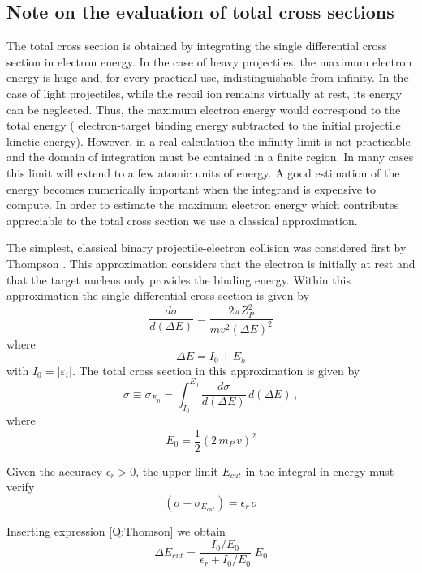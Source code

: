\subsection{Note on the evaluation of total cross sections}

The total cross section is obtained by integrating the single
differential cross section in electron energy. In the case of heavy
projectiles, the maximum electron energy is huge and, for every
practical use, indistinguishable from infinity. In the case of light
projectiles, while the recoil ion remains virtually at rest, its energy
can be neglected. Thus, the maximum electron energy would correspond to
the total energy ( electron-target binding energy subtracted to the
initial projectile kinetic energy). However, in a real calculation the
infinity limit is not practicable and the domain of integration must be
contained in a finite region. In many cases this limit will extend to a
few atomic units of energy. A good estimation of the energy becomes
numerically important when the integrand is expensive to compute. In
order to estimate the maximum electron energy which contributes
appreciable to the total cross section we use a classical
approximation.

The simplest, classical binary projectile-electron collision was
considered first by Thompson \parencite{Thomson1912PMp449}. This approximation
considers that the electron is initially at rest and that the target
nucleus only provides the binding energy. Within this approximation the
single differential cross section is given by
\begin{equation}\label{Q:Thomson}
\frac{d \sigma}{d (\Delta E)} = \frac{2 \pi Z_{P}^{2}}{m v^{2}
(\Delta E)^{2}}
\end{equation}
%
where
$$
\Delta E = I_{0} + E_{k}
$$
with $I_{0}=| \varepsilon_{i} | $. The total cross section in
this approximation is given by
$$
\sigma \equiv \sigma_{E_{0}} = \int_{I_{0}}^{E_{0}} \frac{d
\sigma}{d (\Delta E)} \,d (\Delta E) \,,
$$
where
$$
E_{0}= \frac{1}{2} (2 \,m_{P}\, v)^{2}
$$


\noindent Given the accuracy $\epsilon_{r}>0$, the upper limit
$E_{cut}$ in the integral in energy must verify
\[
  (\sigma - \sigma_{E_{cut}}) = \epsilon_{r} \, \sigma
\]

Inserting expression \ref{Q:Thomson} we obtain
\begin{equation}\label{Q:E-cut}
 \Delta E_{cut} = \frac{I_{0}/E_{0}}{\epsilon_{r} + I_{0}/E_{0}}\; E_{0}
\end{equation}

